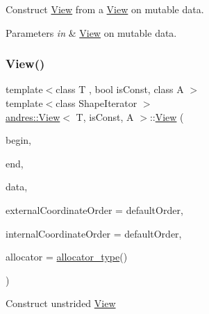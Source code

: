 Construct \hyperlink{classandres_1_1View}{View} from a \hyperlink{classandres_1_1View}{View} on mutable data.


\begin{DoxyParams}{Parameters}
{\em in} & \hyperlink{classandres_1_1View}{View} on mutable data. \\
\hline
\end{DoxyParams}
\mbox{\label{classandres_1_1View_ad7ee18ef33ab6e92138ba0ded346086d}} 
\subsubsection{\texorpdfstring{View()}{View()}\hspace{0.1cm}{\footnotesize\ttfamily [4/5]}}
{\footnotesize\ttfamily template$<$class T , bool is\+Const, class A $>$ \\
template$<$class Shape\+Iterator $>$ \\
\hyperlink{classandres_1_1View}{andres\+::\+View}$<$ T, is\+Const, A $>$\+::\hyperlink{classandres_1_1View}{View} (\begin{DoxyParamCaption}\item[{Shape\+Iterator}]{begin,  }\item[{Shape\+Iterator}]{end,  }\item[{\hyperlink{classandres_1_1View_a9a201594c82be89fccd0fe644ea2f09c}{pointer}}]{data,  }\item[{const \hyperlink{namespaceandres_a2ac8b7aa89d44e8188a7c0ba50f4306b}{Coordinate\+Order} \&}]{external\+Coordinate\+Order = {\ttfamily defaultOrder},  }\item[{const \hyperlink{namespaceandres_a2ac8b7aa89d44e8188a7c0ba50f4306b}{Coordinate\+Order} \&}]{internal\+Coordinate\+Order = {\ttfamily defaultOrder},  }\item[{const \hyperlink{classandres_1_1View_a175e5862a7133a937e7901e5894c2e10}{allocator\+\_\+type} \&}]{allocator = {\ttfamily \hyperlink{classandres_1_1View_a175e5862a7133a937e7901e5894c2e10}{allocator\+\_\+type}()} }\end{DoxyParamCaption})\hspace{0.3cm}{\ttfamily [inline]}}

Construct unstrided \hyperlink{classandres_1_1View}{View}


